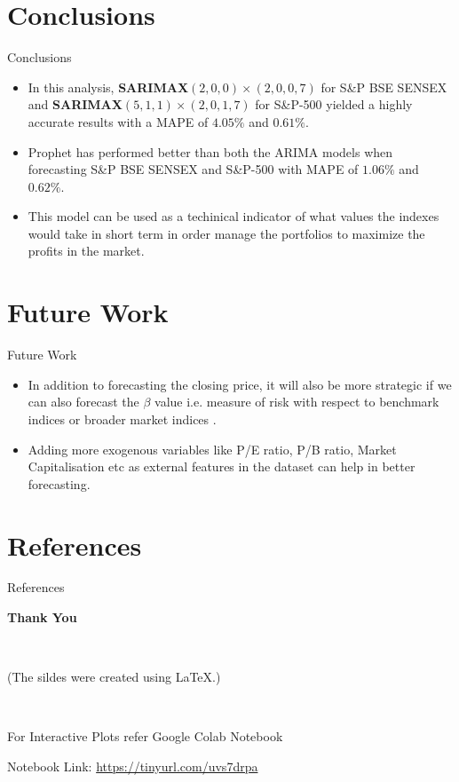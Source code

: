 \documentclass{beamer}
\begin{document}
\section{Conclusions}
\begin{frame}{Conclusions}
	\begin{itemize}
		\item In this analysis, \textbf{SARIMAX$(2, 0, 0) \times (2, 0, 0, 7)$} for S\&P BSE SENSEX and \textbf{SARIMAX$(5, 1, 1) \times (2, 0, 1, 7)$} for S\&P-500 yielded a highly accurate results with a MAPE of $4.05\%$ and $0.61\%$.
		      \pause
		\item Prophet has performed better than both the ARIMA models when forecasting S\&P BSE SENSEX and S\&P-500 with MAPE of $1.06\%$ and $0.62\%$.
		      \pause
		\item This model can be used as a techinical indicator of what values the indexes would take in short term in order manage the portfolios to maximize the profits in the market.
	\end{itemize}
\end{frame}

\section{Future Work}
\begin{frame}{Future Work}
	\begin{itemize}
		\item In addition to forecasting the closing price, it will also be more strategic if we can also forecast the $\beta$ value i.e. measure of risk with respect to benchmark indices or broader market indices \cite{challa_malepati_kolusu_2018}.
		      \pause
		\item Adding more exogenous variables like P/E ratio, P/B ratio, Market Capitalisation etc as external features in the dataset can help in better forecasting.
	\end{itemize}
\end{frame}

\section{References}
\begin{frame}{References}
	\printbibliography
\end{frame}

\begin{frame}
	\Huge{\centerline{\textbf{Thank You}}}\\
	\footnotesize{\centerline{(The sildes were created using \LaTeX.)}}\\
	\small{\centerline{For Interactive Plots refer Google Colab Notebook}}
	\newline
	\small{\centerline{Notebook Link: \href{https://tinyurl.com/uvs7drpa}{https://tinyurl.com/uvs7drpa}}}
\end{frame}
\end{document}
